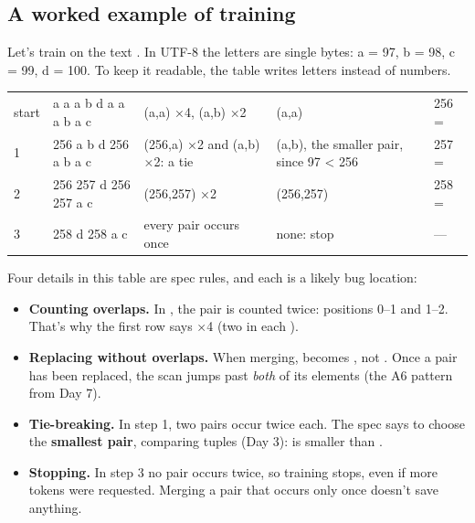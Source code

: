 \documentclass[10pt,a4paper]{article}
\begin{document}
\subsection{A worked example of training}
Let’s train on the text . In UTF-8 the letters are single bytes: a = 97, b = 98, c = 99, d = 100. To keep it readable, the table writes letters instead of numbers.
\begin{datatable}{}{\small}
\begin{xltabular}{\linewidth}{@{}Y{0.44}Y{1.10}Y{1.41}Y{1.56}Y{0.49}@{}}
 &  &  &  &  \\ \hline
\endhead
start & a a a b d a a a b a c & (a,a) ×4, (a,b) ×2 & (a,a) & 256 =  \\
1 & 256 a b d 256 a b a c & (256,a) ×2 and (a,b) ×2: a tie & (a,b), the smaller pair, since 97 \textless{} 256 & 257 =  \\
2 & 256 257 d 256 257 a c & (256,257) ×2 & (256,257) & 258 =  \\
3 & 258 d 258 a c & every pair occurs once & none: stop & — \\
\hline
\end{xltabular}
\end{datatable}
Four details in this table are spec rules, and each is a likely bug location:
\begin{itemize}
\item \textbf{Counting overlaps.} In , the pair  is counted twice: positions 0–1 and 1–2. That’s why the first row says ×4 (two in each ).
\item \textbf{Replacing without overlaps.} When merging,  becomes , not . Once a pair has been replaced, the scan jumps past \emph{both} of its elements (the A6 pattern from Day 7).
\item \textbf{Tie-breaking.} In step 1, two pairs occur twice each. The spec says to choose the \textbf{smallest pair}, comparing tuples (Day 3):  is smaller than .
\item \textbf{Stopping.} In step 3 no pair occurs twice, so training stops, even if more tokens were requested. Merging a pair that occurs only once doesn’t save anything.
\end{itemize}
\end{document}
